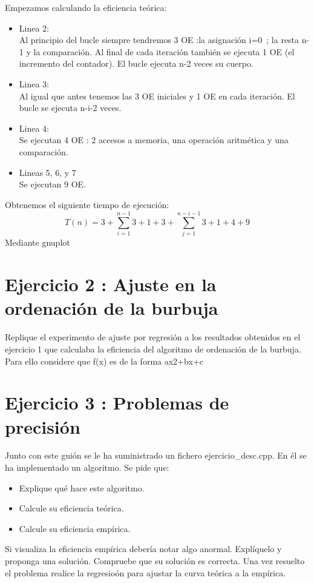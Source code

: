 \documentclass{article}
\begin{document}
Empezamos calculando la eficiencia teórica:
\begin{itemize}
	\item Linea 2: \\ Al principio del bucle siempre tendremos 3 OE :la asignación i=0\ ; la resta  n-1 y la comparación. Al final de cada iteración también se ejecuta 1 OE (el incremento del contador). El bucle ejecuta n-2 veces su cuerpo.
	\item Linea 3: \\ Al igual que antes tenemos las 3 OE iniciales y 1 OE en cada iteración. El bucle se ejecuta n-i-2 veces.
	\item Linea 4: \\ Se ejecutan 4 OE : 2 accesos a memoria, una operación aritmética y una comparación.
	\item Lineas 5, 6, y 7 \\  Se ejecutan 9 OE.
\end{itemize}
	Obtenemos el siguiente tiempo de ejecución: 
	\begin{equation}
		T(n)= 3 + \sum\limits_{i=1}^{n-1}{3+1+3+\sum\limits_{j=1}^{n-i-1}{3+1+4+9}}
	\end{equation}
	Mediante gnuplot
	
\clearpage
\section{Ejercicio 2 : Ajuste en la ordenación de la burbuja}
Replique el experimento de ajuste por regresión a los resultados obtenidos en el ejercicio 1 que calculaba la eficiencia del algoritmo de ordenación de la burbuja. Para ello considere que f(x) es de la forma ax2+bx+c

\clearpage
\section{Ejercicio 3 : Problemas de precisión}
Junto con este guión se le ha suministrado un fichero ejercicio\_desc.cpp. En él se ha implementado un algoritmo. Se pide que:
\begin{itemize}
	\item Explique qué hace este algoritmo.
	\item Calcule su eficiencia teórica.
	\item Calcule su eficiencia empírica.
\end{itemize}
Si visualiza la eficiencia empírica debería notar algo anormal. Explíquelo y proponga una solución. Compruebe que su solución es correcta. Una vez resuelto el problema realice la regresioón para ajustar la curva teórica a la empírica.
\end{document}
